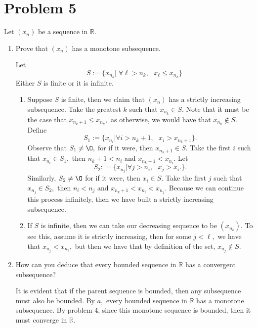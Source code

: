 \documentclass[11pt]{article}
\newcommand{\bbR}{\mathbb{R}}
\renewcommand{\emptyset}{\O}
\begin{document}
\section*{Problem 5}
\begin{problem}
    Let $(x_n)$ be a sequence in $\bbR.$
\end{problem}
\begin{enumerate}
    \item 
    \begin{problem}
        Prove that $(x_n)$ has a monotone subsequence.
    \end{problem}
\begin{solution}
    Let \[S := \{x_{n_k} | \;\text{$\forall\ell > n_k,$ $x_{\ell}\leq x_{n_k}$}\}\]
    Either $S$ is finite or it is infinite.
    \begin{enumerate}
        \item Suppose $S$ is finite, then we claim that $(x_n)$ has a strictly increasing subsequence. Take the greatest $k$ such that $x_{n_k}\in S.$ 
        Note that it must be the case that $x_{n_k + 1}\leq x_{n_k},$ as otherwise, we would have that $x_{n_k}\notin S.$
        Define \[S_1 := \{x_{n_i} | \text{$\forall i>n_{k}+1,$ $x_i > x_{n_{k}+1}$}\}.\] Observe that $S_1 \neq \emptyset,$ for if it were, then $x_{n_k +1} \in S.$ Take the first $i$ such that $x_{n_i}\in S_1,$ then $n_k+1<n_i$ and $x_{n_k+1}< x_{n_i}.$ Let 
        \[S_2 : = \{x_{n_j} | \text{$\forall j>n_{i},$ $x_j > x_{i}$}.\}.\] Similarly, $S_2\neq \emptyset$ for if it were, then $x_i\in S.$ Take the first $j$ such that $x_{n_j}\in S_2,$ then $n_i < n_j$ and $x_{n_k+1} < x_{n_i}<x_{n_j}.$ Because we can continue this process infinitely, then we have built a strictly increasing subsequence. 
        \item If $S$ is infinite, then we can take our decreasing sequence to be $(x_{n_k}).$ To see this, assume it is strictly increasing, then for some $j<\ell,$ we have that $x_{n_j}<x_{n_{\ell}},$ but then we have that by definition of the set, $x_{n_j}\notin S.$
    \end{enumerate}
\end{solution}
\item 
\begin{problem}
    How can you deduce that every bounded sequence in $\bbR$ has a convergent
 subsequence?
\end{problem}
\begin{solution}
    It is evident that if the parent sequence is bounded, then any subsequence must also be bounded. By $a,$ every bounded sequence in $\bbR$ has a monotone subsequence. By problem 4, since this monotone sequence is bounded, then it must converge in $\bbR.$

\end{solution}
\end{enumerate}
\end{document}
